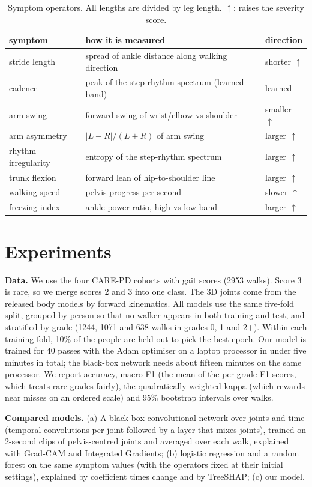 \documentclass[10pt,twocolumn]{article}
\begin{document}
\begin{table}[t]
\centering\small
\begin{tabular}{@{}lll@{}}
\toprule
symptom & how it is measured & direction \\
\midrule
stride length & spread of ankle distance along walking direction & shorter $\uparrow$ \\
cadence & peak of the step-rhythm spectrum (learned band) & learned \\
arm swing & forward swing of wrist/elbow vs shoulder & smaller $\uparrow$ \\
arm asymmetry & $|L-R|/(L+R)$ of arm swing & larger $\uparrow$ \\
rhythm irregularity & entropy of the step-rhythm spectrum & larger $\uparrow$ \\
trunk flexion & forward lean of hip-to-shoulder line & larger $\uparrow$ \\
walking speed & pelvis progress per second & slower $\uparrow$ \\
freezing index & ankle power ratio, high vs low band & larger $\uparrow$ \\
\bottomrule
\end{tabular}
\caption{Symptom operators. All lengths are divided by leg length. $\uparrow$: raises the severity score.}
\label{tab:ops}
\end{table}

\section{Experiments}
\textbf{Data.} We use the four CARE-PD cohorts with gait scores (2953 walks). Score 3 is rare, so we merge
scores 2 and 3 into one class. The 3D joints come from the released body models by forward kinematics.
All models use the same five-fold split, grouped by person so that no walker appears in both training and test,
and stratified by grade (1244, 1071 and 638 walks in grades 0, 1 and 2+). Within each training fold, 10\% of the
people are held out to pick the best epoch. Our model is trained for 40 passes with the Adam optimiser on a
laptop processor in under five minutes in total; the black-box network needs about fifteen minutes on the same
processor. We report accuracy, macro-F1 (the mean of the per-grade F1 scores, which treats rare grades fairly),
the quadratically weighted kappa (which rewards near misses on an ordered scale) and 95\% bootstrap intervals
over walks.

\textbf{Compared models.} (a) A black-box convolutional network over joints and time (temporal convolutions per joint
followed by a layer that mixes joints), trained on 2-second clips of pelvis-centred joints and averaged over each
walk, explained with Grad-CAM and Integrated Gradients; (b) logistic regression and a random forest on the same symptom values (with the
operators fixed at their initial settings), explained by coefficient times change and by TreeSHAP; (c) our model.
\end{document}
